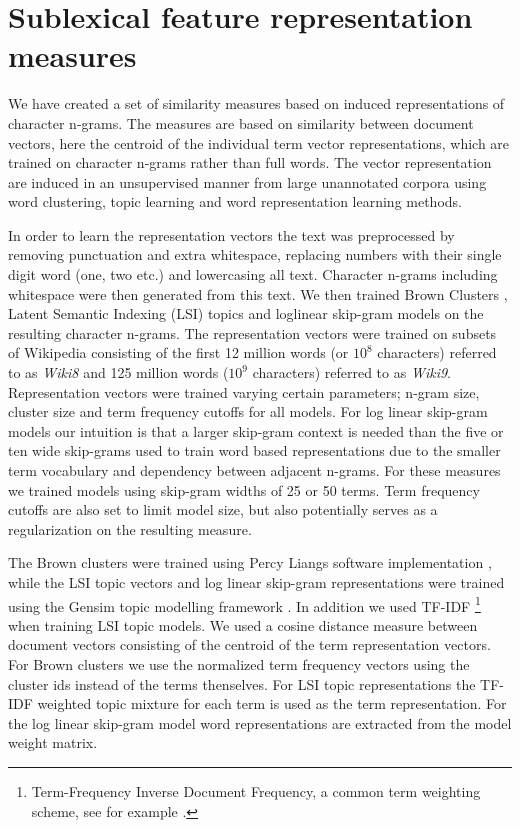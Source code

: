\section{Sublexical feature representation measures}
\label{subrep-features}

We have created a set of similarity measures based on induced representations of character n-grams. The measures are based on similarity between document vectors, here the centroid of the individual term vector representations, which are trained on character n-grams rather than full words. The vector representation are induced in an unsupervised manner from large unannotated corpora using word clustering, topic learning and word representation learning methods.

In order to learn the representation vectors the text was preprocessed by removing punctuation and extra whitespace, replacing numbers with their single digit word (one, two etc.) and lowercasing all text. Character n-grams including whitespace were then generated from this text. We then trained Brown Clusters \cite{brown1992class}, Latent Semantic Indexing (LSI) topics \cite{deerwester1990indexing} and loglinear skip-gram models \cite{mikolov2013efficient} on the resulting character n-grams. The representation vectors were trained on subsets of Wikipedia consisting of the first 12 million words (or $10^8$ characters) referred to as {\it Wiki8} and 125 million words ($10^9$ characters) referred to as {\it Wiki9}. Representation vectors were trained varying certain parameters;  n-gram size, cluster size and term frequency cutoffs for all models.
For log linear skip-gram models our intuition is that a larger skip-gram context is needed than the five or ten wide skip-grams used to train word based representations due to the smaller term vocabulary and dependency between adjacent n-grams. For these measures we trained models using skip-gram widths of 25 or 50 terms. Term frequency cutoffs are also set to limit model size, but also potentially serves as a regularization on the resulting measure.

The Brown clusters were trained using Percy Liangs software implementation \cite{liang2005semi}, while the LSI topic vectors and log linear skip-gram representations were trained using the Gensim topic modelling framework \cite{gensim_lrec}. In addition we used TF-IDF \footnote{Term-Frequency Inverse Document Frequency, a common term weighting scheme, see for example \cite{manning2008introduction}.} when training LSI topic models. We used a cosine distance measure between document vectors consisting of the centroid of the term representation vectors. For Brown clusters we use the normalized term frequency vectors using the cluster ids instead of the terms thenselves. For LSI topic representations the TF-IDF weighted topic mixture for each term is used as the term representation. For the log linear skip-gram model word representations are extracted from the model weight matrix.

